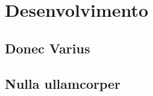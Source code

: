 \chapter{Desenvolvimento}\par
\lipsum[1]
\section{Donec Varius}
\lipsum[1-2]
\section{Nulla ullamcorper}
\lipsum[1-2]